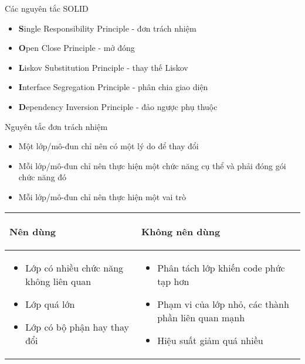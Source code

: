 \documentclass{beamer}
\begin{document}
\begin{frame}{Các nguyên tắc SOLID}
    \begin{itemize}
        \item \textbf{\color{red}S}ingle Responsibility Principle - đơn trách nhiệm
        \item \textbf{\color{red}O}pen Close Principle - mở đóng
        \item \textbf{\color{red}L}iskov Substitution Principle - thay thế Liskov
        \item \textbf{\color{red}I}nterface Segregation Principle - phân chia giao diện
        \item \textbf{\color{red}D}ependency Inversion Principle - đảo ngược phụ thuộc
    \end{itemize}
\end{frame}

\begin{frame}{Nguyên tắc đơn trách nhiệm}
    \begin{itemize}
        \item Một lớp/mô-đun chỉ nên có một lý do để thay đổi
        \item Mỗi lớp/mô-đun chỉ nên thực hiện một chức năng cụ thể
        và phải đóng gói chức năng đó
        \item Mỗi lớp/mô-đun chỉ nên thực hiện một vai trò
    \end{itemize}

    \begin{table}
        \centering
        \begin{tabular}{|p{4.5cm}|p{4.5cm}|}
            \hline\vspace{-0.5cm}
            \begin{center}\textbf{Nên dùng}\end{center} 
            & \vspace{-0.5cm}\begin{center}\textbf{Không nên dùng}\end{center} \\
            \hline
            \vspace{-0.3cm}
            \begin{itemize}
                \item Lớp có nhiều chức năng không liên quan
                \item Lớp quá lớn
                \item Lớp có bộ phận hay thay đổi
            \end{itemize}
            & \vspace{-0.3cm}\begin{itemize}
                \item Phân tách lớp khiến code phức tạp hơn
                \item Phạm vi của lớp nhỏ, các thành phần liên quan mạnh
                \item Hiệu suất giảm quá nhiều
            \end{itemize} \\
            \hline
        \end{tabular}
    \end{table}
\end{frame}
\end{document}
